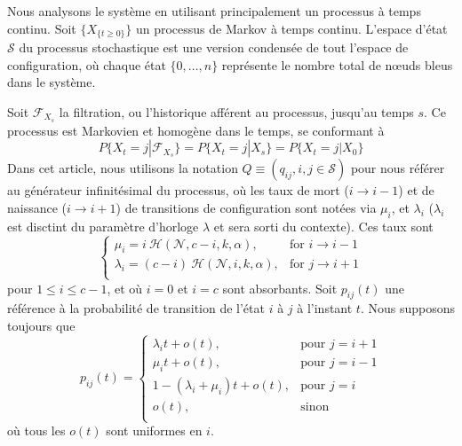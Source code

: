 \documentclass[a4,twocolumn,10pt]{article}
\theoremstyle{definition}
\begin{document}
\begin{appendices}
Nous analysons le système en utilisant principalement un processus à temps continu. Soit $\{X_{\{t \geq 0\}}\}$ un processus de Markov à temps continu.
L'espace d'état $\mathcal{S}$ du processus stochastique est une version condensée de tout l'espace de configuration, où chaque état $\{0, \dots, n\}$ représente le nombre total de nœuds bleus dans le système.

Soit $\mathcal{F}_{X_s}$ la filtration, ou l'historique afférent au processus, jusqu'au temps $s$. Ce processus est Markovien et homogène dans le temps, se conformant à
\[
    P\{X_t = j | \mathcal{F}_{X_s}\} = P\{X_t = j | X_s\} = P\{X_t = j | X_0\}    
\]
Dans cet article, nous utilisons la notation $Q \equiv (q_{ij}, i, j \in \mathcal{S})$ pour nous référer au générateur infinitésimal du processus, où les taux de mort ($i \rightarrow i-1$) et de naissance ($i \rightarrow i+1$) de transitions de configuration sont notées via $\mu_i$, et $\lambda_i$ ($\lambda_ i$ est disctint du paramètre d'horloge $\lambda$ et sera sorti du contexte). Ces taux sont
\[
    \begin{cases}
        \mu_i = i\ \mathcal{H}(\mathcal{N}, c-i, k, \alpha), & \text{for } i \rightarrow i - 1 \\
        \lambda_i = (c-i)\ \mathcal{H}(\mathcal{N}, i, k, \alpha), & \text{for } j \rightarrow i + 1 \\
    \end{cases}
\]
pour $1\leq i\leq c-1$, et où $i = 0$ et $i = c$ sont absorbants. Soit $p_{ij}(t)$ une référence à la probabilité de transition de l'état $i$ à $j$ à l'instant $t$.
Nous supposons toujours que
\[
    p_{ij}(t) = 
    \begin{cases}
      \lambda_it + o(t), & \text{pour } j = i + 1 \\
      \mu_it + o(t), & \text{pour } j = i - 1 \\
      1 - (\lambda_i + \mu_i)t + o(t), & \text{pour } j = i \\
      o(t), & \text{sinon }\\
    \end{cases}
\]
où tous les $o(t)$ sont uniformes en $i$.


\end{appendices}
\end{document}
